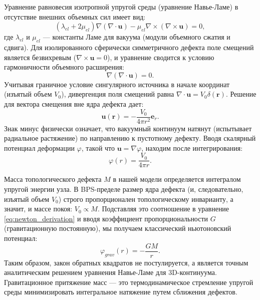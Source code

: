 \documentclass[12pt,a4paper]{article}
\begin{document}
Уравнение равновесия изотропной упругой среды (уравнение Навье-Ламе) в отсутствие внешних объемных сил имеет вид:
\begin{equation}
	(\lambda_{el} + 2\mu_{el}) \nabla (\nabla \cdot \mathbf{u}) - \mu_{el} \nabla \times (\nabla \times \mathbf{u}) = 0,
\end{equation}
где $\lambda_{el}$ и $\mu_{el}$ — константы Ламе для вакуума (модули объемного сжатия и сдвига). 
Для изолированного сферически симметричного дефекта поле смещений является безвихревым ($\nabla \times \mathbf{u} = 0$), и уравнение сводится к условию гармоничности объемного расширения:
\begin{equation}
	\nabla (\nabla \cdot \mathbf{u}) = 0.
\end{equation}
Учитывая граничное условие сингулярного источника в начале координат (изъятый объем $V_0$), дивергенция поля смещений равна $\nabla \cdot \mathbf{u} = V_0 \delta(\mathbf{r})$. Решение для вектора смещения вне ядра дефекта дает:
\begin{equation}
	\mathbf{u}(\mathbf{r}) = -\frac{V_0}{4\pi r^2} \mathbf{e}_r.
\end{equation}
Знак минус физически означает, что вакуумный континуум натянут (испытывает радиальное растяжение) по направлению к пустотному дефекту. Вводя скалярный потенциал деформации $\varphi$, такой что $\mathbf{u} = \nabla \varphi$, находим после интегрирования:
\begin{equation}
	\varphi(r) = \frac{V_0}{4\pi r}.
	\label{eq:newton_derivation}
\end{equation}

Масса топологического дефекта $M$ в нашей модели определяется интегралом упругой энергии узла. В BPS-пределе размер ядра дефекта (и, следовательно, изъятый объем $V_0$) строго пропорционален топологическому инварианту, а значит, и массе покоя: $V_0 \propto M$. Подставляя это соотношение в уравнение \eqref{eq:newton_derivation} и вводя коэффициент пропорциональности $G$ (гравитационную постоянную), мы получаем классический ньютоновский потенциал:
\begin{equation}
	\varphi_{grav}(r) = - \frac{G M}{r}.
\end{equation}
Таким образом, закон обратных квадратов не постулируется, а является точным аналитическим решением уравнения Навье-Ламе для 3D-континуума. Гравитационное притяжение масс — это термодинамическое стремление упругой среды минимизировать интегральное натяжение путем сближения дефектов.
\end{document}
